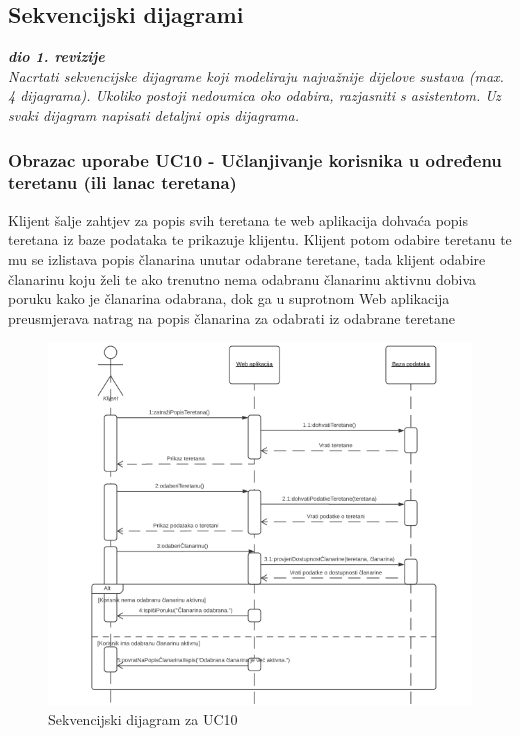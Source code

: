 				
				\eject
				
				
			\subsection{Sekvencijski dijagrami}
				
				\textbf{\textit{dio 1. revizije}}\\
				
				\textit{Nacrtati sekvencijske dijagrame koji modeliraju najvažnije dijelove sustava (max. 4 dijagrama). Ukoliko postoji nedoumica oko odabira, razjasniti s asistentom. Uz svaki dijagram napisati detaljni opis dijagrama.}
				
					\subsubsection{Obrazac uporabe UC10 - Učlanjivanje korisnika u određenu teretanu (ili lanac teretana)}
					\textit{}Klijent šalje zahtjev za popis svih teretana te web aplikacija dohvaća popis teretana
                    iz baze podataka te prikazuje klijentu. Klijent potom odabire teretanu te mu se izlistava
                    popis članarina unutar odabrane teretane, tada klijent odabire članarinu koju želi te 
                    ako trenutno nema odabranu članarinu aktivnu dobiva poruku kako je članarina odabrana, 
                    dok ga u suprotnom Web aplikacija preusmjerava natrag na popis članarina za odabrati
                    iz odabrane teretane\\
                    
                    \begin{figure}[H]
			            \includegraphics[scale=0.9]{slike/UC10.PNG} %
			            \centering
			            \caption{Sekvencijski dijagram za UC10}
			            \label{fig:promjene}
		            \end{figure}
                    
